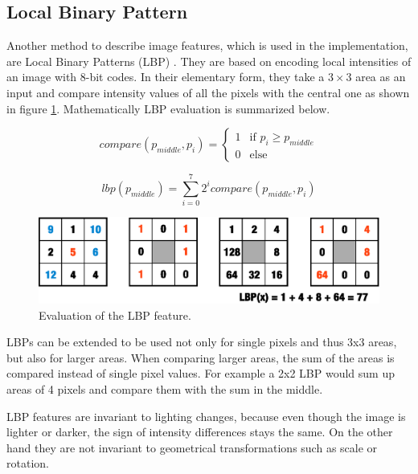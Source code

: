 \subsection{Local Binary Pattern}

Another method to describe image features, which is used in the implementation, are Local Binary Patterns (LBP) \cite{Ojala02multiresolutiongrayscale}. They are based on encoding local intensities of an image with 8-bit codes. In their elementary form, they take a $3 \times 3$ area as an input and compare intensity values of all the pixels with the central one as shown in figure \ref{fig:lbp}. Mathematically LBP evaluation is summarized below.

\begin{equation}
 compare(p_{middle},p_{i}) =
  \begin{cases}
   1 & \text{if } p_{i} \geq p_{middle} \\
   0 & \text{else}
  \end{cases}
\end{equation}

\begin{equation}
lbp(p_{middle})=\sum_{i=0}^{7} 2^{i}
compare(p_{middle},p_{i})
\end{equation}

\begin{center}
\begin{figure}[ht]
	\centering\includegraphics[width=12cm]{fig/lbp.eps}
	\caption{Evaluation of the LBP feature.}
	\label{fig:lbp}
\end{figure}
\end{center}

LBPs can be extended to be used not only for single pixels and thus 3x3 areas, but also for larger areas. When comparing larger areas, the sum of the areas is compared instead of single pixel values. For example a 2x2 LBP would sum up areas of 4 pixels and compare them with the sum in the middle.

LBP features are invariant to lighting changes, because even though the image is lighter or darker, the sign of intensity differences stays the same. On the other hand they are not invariant to geometrical transformations such as scale or rotation.

